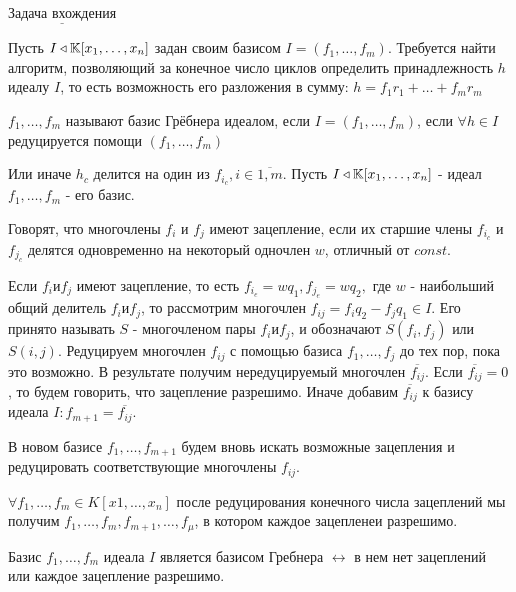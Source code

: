 $\underline{\text{Задача вхождения}}$ 

Пусть $I \triangleleft \mathbb{K}[x_1,\ldots,x_n]$ задан своим базисом $I = (f_1,\ldots,f_m)$. Требуется найти алгоритм, позволяющий за конечное число циклов определить принадлежность $h$ идеалу $I$, то есть возможность его разложения в сумму: $h = f_1r_1 + \ldots + f_mr_m$

\opr $f_1,\ldots,f_m$ называют базис Грёбнера идеалом, если $I = (f_1,\ldots,f_m)$, если $\forall h \in I$ редуцируется помощи $(f_1,\dots,f_m)$

Или иначе $h_c$ делится на один из $f_{i_c},i \in \overline{1,m}$. Пусть $I \triangleleft \mathbb{K}[x_1,\ldots,x_n]$ - идеал $f_1,\ldots,f_m $ - его базис.

\opr Говорят, что многочлены $f_i$ и $f_j$ имеют зацепление, если их старшие члены $f_{i_c}$ и $f_{j_c}$ делятся одновременно на некоторый одночлен $w$, отличный от $const$.

Если $f_i и f_j$ имеют зацепление, то есть $f_{i_e} = wq_1, f_{j_e} = wq_2,$ где $w$ - наибольший общий делитель $f_i и f_j$, то рассмотрим многочлен $f_{ij} = f_iq_2 - f_jq_1 \in I$. Его принято называть $S$ - многочленом пары $f_i и f_j$, и обозначают $S(f_i,f_j)$ или $S(i,j)$. Редуцируем многочлен $f_{ij}$ с помощью базиса $f_1,\ldots,f_j$ до тех пор, пока это возможно. В результате получим нередуцируемый многочлен $\overline{f_{ij}}$. Если $\overline{f_{ij}} = 0$, то будем говорить, что зацепление разрешимо. Иначе добавим $\overline{f_{ij}}$ к базису идеала $I: f_{m+1} = \overline{f_{ij}}$.

 В новом базисе $f_1,\ldots,f_{m+1}$ будем вновь искать возможные зацепления и редуцировать соответствующие многочлены $f_{ij}$.

\thr $\forall f_1,\ldots,f_m \in K[x1,\ldots,x_n]$ после редуцирования конечного числа зацеплений мы получим $f_1,\ldots,f_m,f_{m+1},\ldots,f_\mu$, в котором каждое зацепленеи разрешимо.

\thr Базис $f_1,\ldots,f_m$ идеала $I$ является базисом Гребнера $\leftrightarrow$ в нем нет зацеплений или каждое зацепление разрешимо.

